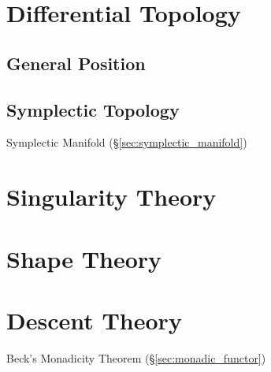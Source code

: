 \section{Differential Topology}\label{sec:differential_topology}

\subsection{General Position}\label{sec:general_position}

\subsection{Symplectic Topology}\label{sec:symplectic_topology}

Symplectic Manifold (\S\ref{sec:symplectic_manifold})



\section{Singularity Theory}\label{sec:singularity_theory}

\section{Shape Theory}\label{sec:shape_theory}

\section{Descent Theory}\label{sec:descent_theory}

Beck's Monadicity Theorem (\S\ref{sec:monadic_functor})



